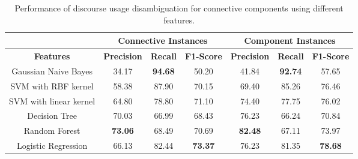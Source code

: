 \begin{table}[ht]
\centering
\begin{tabular}{|c|c|c|c|c|c|c|}
\hline
                            & \multicolumn{3}{|c|}{Connective Instances} & \multicolumn{3}{|c|}{Component Instances} \\ \hline
\bf Features                & \bf Precision & \bf Recall & \bf F1-Score  & \bf Precision & \bf Recall & \bf F1-Score \\ \hline
    Gaussian Naive Bayes    &     34.17     & \bf 94.68  &     50.20     &     41.84     & \bf 92.74  &     57.65    \\ \hline
    SVM with RBF kernel     &     58.38     &     87.90  &     70.15     &     69.40     &     85.26  &     76.46    \\ \hline
    SVM with linear kernel  &     64.80     &     78.80  &     71.10     &     74.40     &     77.75  &     76.02    \\ \hline
    Decision Tree           &     70.03     &     66.99  &     68.43     &     76.23     &     66.24  &     70.84    \\ \hline
    Random Forest           & \bf 73.06     &     68.49  &     70.69     & \bf 82.48     &     67.11  &     73.97    \\ \hline
    Logistic Regression     &     66.13     &     82.44  & \bf 73.37     &     76.23     &     81.35  & \bf 78.68    \\ \hline

\end{tabular}
\caption{\label{t:recognition-connective-models} Performance of discourse usage
disambiguation for connective components using different features. }
\end{table}


